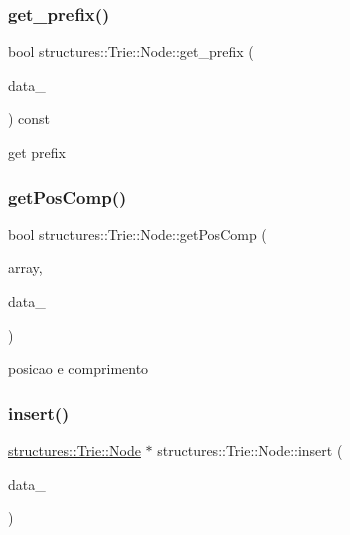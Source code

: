 \subsubsection{\texorpdfstring{get\_prefix()}{get\_prefix()}}
{\footnotesize\ttfamily bool structures\+::\+Trie\+::\+Node\+::get\+\_\+prefix (\begin{DoxyParamCaption}\item[{const string \&}]{data\+\_\+ }\end{DoxyParamCaption}) const}



get prefix 

\mbox{\label{structstructures_1_1Trie_1_1Node_a206815fbb1be0496007790134262c13a}} 
\subsubsection{\texorpdfstring{getPosComp()}{getPosComp()}}
{\footnotesize\ttfamily bool structures\+::\+Trie\+::\+Node\+::get\+Pos\+Comp (\begin{DoxyParamCaption}\item[{\mbox{\hyperlink{classstructures_1_1ArrayList}{Array\+List}}$<$ unsigned long $>$ \&}]{array,  }\item[{const string \&}]{data\+\_\+ }\end{DoxyParamCaption})}



posicao e comprimento 

\mbox{\label{structstructures_1_1Trie_1_1Node_a825f36b61a5878b622b77a4956756505}} 
\subsubsection{\texorpdfstring{insert()}{insert()}}
{\footnotesize\ttfamily \mbox{\hyperlink{structstructures_1_1Trie_1_1Node}{structures\+::\+Trie\+::\+Node}} $\ast$ structures\+::\+Trie\+::\+Node\+::insert (\begin{DoxyParamCaption}\item[{const string \&}]{data\+\_\+ }\end{DoxyParamCaption})}



